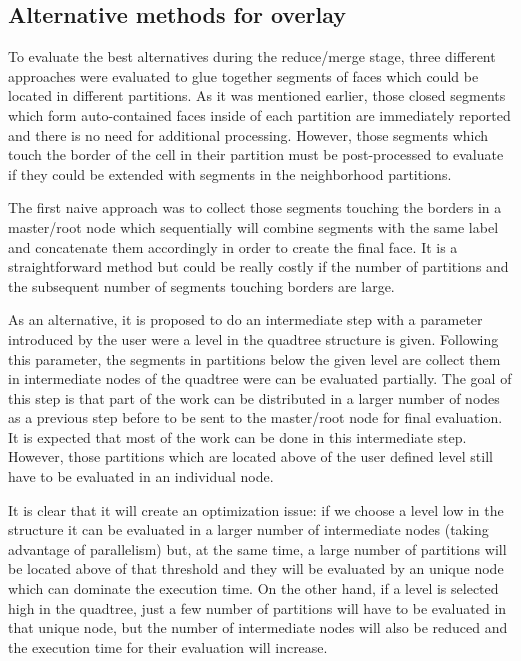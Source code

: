 \subsection{Alternative methods for overlay}\label{sec:alternative_methods}

To evaluate the best alternatives during the reduce/merge stage, three different approaches were evaluated to glue together segments of faces which could be located in different partitions.  As it was mentioned earlier, those closed segments which form auto-contained faces inside of each partition are immediately reported and there is no need for additional processing.  However, those segments which touch the border of the cell in their partition must be post-processed to evaluate if they could be extended with segments in the neighborhood partitions.

The first naive approach was to collect those segments touching the borders in a master/root node which sequentially will combine segments with the same label and concatenate them accordingly in order to create the final face.  It is a straightforward method but could be really costly if the number of partitions and the subsequent number of segments touching borders are large.

As an alternative, it is proposed to do an intermediate step with a parameter introduced by the user were a level in the quadtree structure is given.  Following this parameter, the segments in partitions below the given level are collect them in intermediate nodes of the quadtree were can be evaluated partially.  The goal of this step is that part of the work can be distributed in a larger number of nodes as a previous step before to be sent to the master/root node for final evaluation.  It is expected that most of the work can be done in this intermediate step.  However, those partitions which are located above of the user defined level still have to be evaluated in an individual node.

It is clear that it will create an optimization issue: if we choose a level low in the structure it can be evaluated in a larger number of intermediate nodes (taking advantage of parallelism) but, at the same time, a large number of partitions will be located above of that threshold and they will be evaluated by an unique node which can dominate the execution time.  On the other hand, if a level is selected high in the quadtree, just a few number of partitions will have to be evaluated in that unique node, but the number of intermediate nodes will also be reduced and the execution time for their evaluation will increase.

